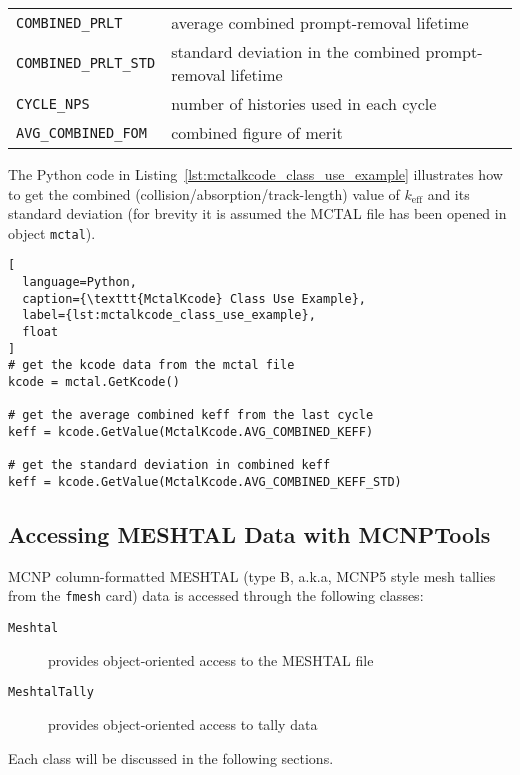 \documentclass[11pt]{article}
\begin{document}
\begin{table}[]
\begin{center}
\begin{tabular}{lp{4.0in}}
        \texttt{COMBINED\_PRLT}                & average combined prompt-removal lifetime \\
        \texttt{COMBINED\_PRLT\_STD}           & standard deviation in the combined prompt-removal lifetime \\
        \texttt{CYCLE\_NPS}                    & number of histories used in each cycle \\
        \texttt{AVG\_COMBINED\_FOM}            & combined figure of merit \\
      \bottomrule
    \end{tabular}
  \end{center}
\end{table}

The Python code in Listing~\ref{lst:mctalkcode_class_use_example} illustrates
how to get the combined (collision/absorption/track-length) value of
$k_{\mathrm{eff}}$ and its standard deviation (for brevity it is assumed the
MCTAL file has been opened in object \texttt{mctal}).

\begin{lstlisting}[
  language=Python,
  caption={\texttt{MctalKcode} Class Use Example},
  label={lst:mctalkcode_class_use_example},
  float
]
# get the kcode data from the mctal file
kcode = mctal.GetKcode()

# get the average combined keff from the last cycle
keff = kcode.GetValue(MctalKcode.AVG_COMBINED_KEFF)

# get the standard deviation in combined keff
keff = kcode.GetValue(MctalKcode.AVG_COMBINED_KEFF_STD)
\end{lstlisting}

\subsection{Accessing MESHTAL Data with MCNPTools}\label{accessing-meshtal-data-with-mcnptools}

MCNP column-formatted MESHTAL (type B, a.k.a, MCNP5 style mesh tallies from the
\texttt{fmesh} card) data is accessed through the following classes:

\begin{description}
  \item[\texttt{Meshtal}] provides object-oriented access to the MESHTAL file
  \item[\texttt{MeshtalTally}] provides object-oriented access to tally data
\end{description}

Each class will be discussed in the following sections.
\end{document}
